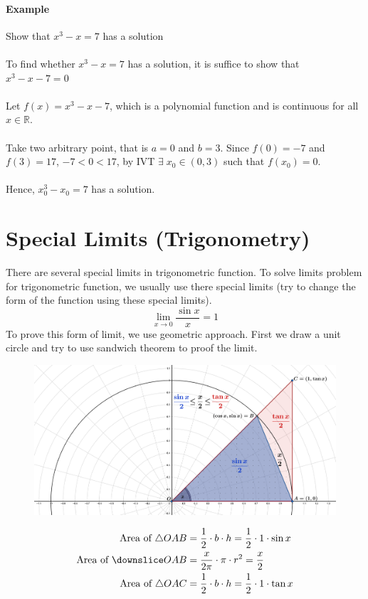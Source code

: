 \documentclass[12pt]{article}
\begin{document}
\paragraph{Example} Show that $x^3 - x = 7$ has a solution \\ \\
To find whether $x^3 - x = 7$ has a solution, it is suffice to show that $x^3 - x - 7 = 0$ \\ \\
Let $f(x) = x^3 - x - 7 $, which is a polynomial function and is continuous for all $x \in \mathbb{R}$. \\ \\
Take two arbitrary point, that is $a = 0$  and $b = 3$. Since $f(0) = -7$ and $f(3) = 17$, $ -7 < 0 < 17 $,
by IVT $\exists \; x_0 \in (0, 3)$ such that $f(x_0) = 0$. \\ \\
Hence, $x_0^3 - x_0 = 7$ has a solution.

\section{Special Limits (Trigonometry)}
There are several special limits in trigonometric function. To solve limits problem
for trigonometric function, we usually use there special limits (try to change the form of the function 
using these special limits). 
\[
    \lim_{x \to 0} \frac{\sin x }{x} = 1
\]
\noindent
To prove this form of limit, we use geometric approach. First we draw a unit circle and try to use
sandwich theorem to proof the limit.
\begin{figure}[h!]
    \centering
    \includegraphics[width = 0.7\linewidth]{Images/proof special limit 1.png}
\end{figure}

\begin{align*} 
    \textrm{Area of }\triangle OAB &= \frac{1}{2} \cdot b \cdot h =  \frac{1}{2} \cdot 1 \cdot \sin x \\
    \textrm{Area of }\downslice OAB &= \frac{x}{2\pi} \cdot \pi \cdot r^2 = \frac{x}{2} \\
    \textrm{Area of }\triangle OAC &= \frac{1}{2} \cdot b \cdot h =  \frac{1}{2} \cdot 1 \cdot \tan x \\
\end{align*}
\end{document}
